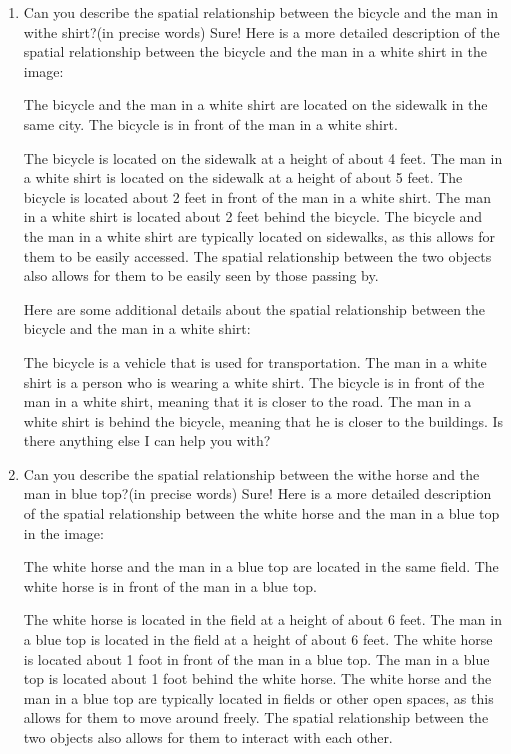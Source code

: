 \begin{enumerate}
    \item Can you describe the spatial relationship between the bicycle and the man in withe shirt?(in precise words)
    \subitem Sure! Here is a more detailed description of the spatial relationship between the bicycle and the man in a white shirt in the image:

    The bicycle and the man in a white shirt are located on the sidewalk in the same city. The bicycle is in front of the man in a white shirt.
    
    The bicycle is located on the sidewalk at a height of about 4 feet.
    The man in a white shirt is located on the sidewalk at a height of about 5 feet.
    The bicycle is located about 2 feet in front of the man in a white shirt.
    The man in a white shirt is located about 2 feet behind the bicycle.
    The bicycle and the man in a white shirt are typically located on sidewalks, as this allows for them to be easily accessed. The spatial relationship between the two objects also allows for them to be easily seen by those passing by.
    
    Here are some additional details about the spatial relationship between the bicycle and the man in a white shirt:
    
    The bicycle is a vehicle that is used for transportation.
    The man in a white shirt is a person who is wearing a white shirt.
    The bicycle is in front of the man in a white shirt, meaning that it is closer to the road.
    The man in a white shirt is behind the bicycle, meaning that he is closer to the buildings.
    Is there anything else I can help you with?
    \item Can you describe the spatial relationship between the withe horse and the man in blue top?(in precise words)
    \subitem 
    Sure! Here is a more detailed description of the spatial relationship between the white horse and the man in a blue top in the image:
    
    The white horse and the man in a blue top are located in the same field. The white horse is in front of the man in a blue top.
    
    The white horse is located in the field at a height of about 6 feet.
    The man in a blue top is located in the field at a height of about 6 feet.
    The white horse is located about 1 foot in front of the man in a blue top.
    The man in a blue top is located about 1 foot behind the white horse.
    The white horse and the man in a blue top are typically located in fields or other open spaces, as this allows for them to move around freely. The spatial relationship between the two objects also allows for them to interact with each other.
    

\end{enumerate}
